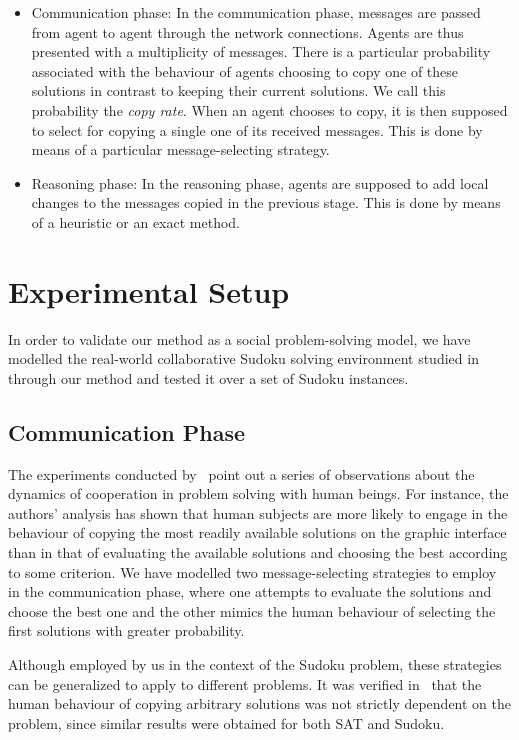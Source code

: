 \documentclass{article}
\begin{document}
\begin{itemize}
\item
Communication phase: In the communication phase, messages are passed from agent to agent through the network connections. Agents are thus presented with a multiplicity of messages. There is a particular probability associated with the behaviour of agents choosing to copy one of these solutions in contrast to keeping their current solutions. We call this probability the \emph{copy rate}. When an agent chooses to copy, it is then supposed to select for copying a single one of its received messages. This is done by means of a particular message-selecting strategy.

\item
Reasoning phase: In the reasoning phase, agents are supposed to add local changes to the messages copied in the previous stage. This is done by means of a heuristic or an exact method.
\end{itemize}

\section{Experimental Setup}
\label{sec:setup}

In order to validate our method as a social problem-solving model, we have modelled the real-world collaborative Sudoku solving environment studied in~\cite{farenzena:collabem} through our method and tested it over a set of Sudoku instances.

\subsection{Communication Phase}

The experiments conducted by~\cite{farenzena:collabem} point out a series of observations about the dynamics of cooperation in problem solving with human beings. For instance, the authors' analysis has shown that human subjects are more likely to engage in the behaviour of copying the most readily available solutions on the graphic interface than in that of evaluating the available solutions and choosing the best according to some criterion. We have modelled two message-selecting strategies to employ in the communication phase, where one attempts to evaluate the solutions and choose the best one and the other mimics the human behaviour of selecting the first solutions with greater probability.

Although employed by us in the context of the Sudoku problem, these strategies can be generalized to apply to different problems. It was verified in~\cite{farenzena:collabem} that the human behaviour of copying arbitrary solutions was not strictly dependent on the problem, since similar results were obtained for both SAT and Sudoku.
\end{document}
